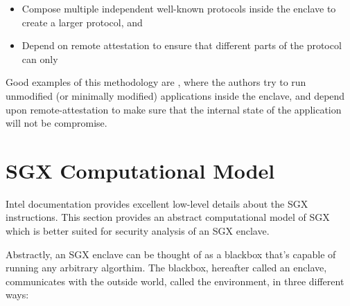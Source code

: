\documentclass[11pt]{article}
\newcommand{\env}{\textsf{environment}}
\begin{document}
  \begin{itemize}
    \item Compose multiple independent well-known protocols inside the
      enclave to create a larger protocol, and

    \item Depend on remote attestation to ensure that different parts
      of the protocol can only
  \end{itemize}

  Good examples of this methodology are \cite{Haven, Graphene, Scone},
  where the authors try to run unmodified (or minimally modified)
  applications inside the enclave, and depend upon remote-attestation
  to make sure that the internal state of the application will not be
  compromise.


  \section{SGX Computational Model}
  Intel documentation\cite{intelsdm} provides excellent low-level
  details about the SGX instructions. This section provides an
  abstract computational model of SGX which is better suited for
  security analysis of an SGX enclave.

  Abstractly, an SGX enclave can be thought of as a blackbox that's
  capable of running any arbitrary algorthim. The blackbox, hereafter
  called an enclave, communicates with the outside world, called the
  \env, in three different ways:
\end{document}
